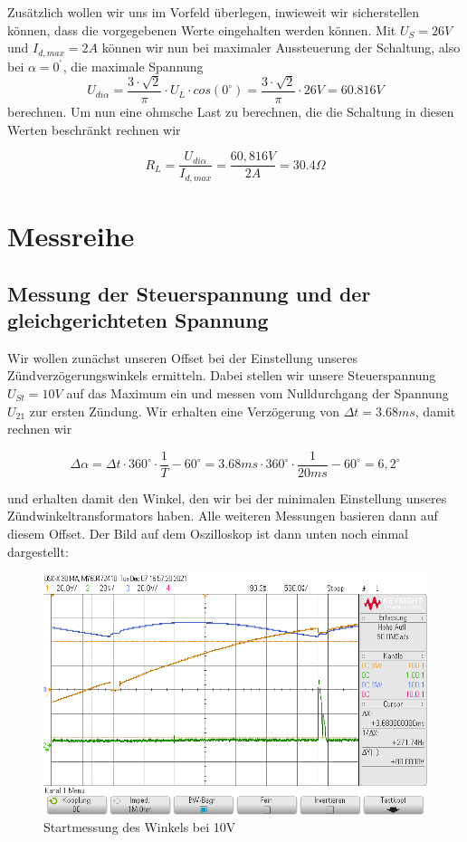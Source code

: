 \documentclass{article}
\begin{document}
Zusätzlich wollen wir uns im Vorfeld überlegen, inwieweit wir sicherstellen können, dass die vorgegebenen Werte eingehalten werden können. Mit $U_{S} = 26V$ und $I_{d,max} = 2A$ können wir nun bei maximaler Aussteuerung der Schaltung, also bei $\alpha = 0^{^{\circ}}$, die maximale Spannung $$U_{di\alpha} = \frac{3\cdot \sqrt{2}}{\pi}\cdot U_{L} \cdot cos(0^{\circ}) = \frac{3\cdot \sqrt{2}}{\pi}\cdot 26V = 60.816V$$
berechnen. Um nun eine ohmsche Last zu berechnen, die die Schaltung in diesen Werten beschränkt rechnen wir

\begin{equation*}
  \label{eq:1}
  R_{L} = \frac{U_{di\alpha}}{I_{d,max}} = \frac{60,816V}{2A} = 30.4 \Omega
\end{equation*}

\section{Messreihe}

\subsection{Messung der Steuerspannung und der gleichgerichteten Spannung}

Wir wollen zunächst unseren Offset bei der Einstellung unseres Zündverzögerungswinkels ermitteln. Dabei stellen wir unsere Steuerspannung $U_{St} = 10V$ auf das Maximum ein und messen vom Nulldurchgang der Spannung $U_{21}$ zur ersten Zündung. Wir erhalten eine Verzögerung von $\Delta t = 3.68ms$, damit rechnen wir

\begin{equation*}
  \label{eq:2}
  \Delta\alpha = \Delta t \cdot 360^{\circ} \cdot \frac{1}{T} - 60^{\circ} = 3.68ms \cdot 360^{\circ} \cdot \frac{1}{20ms} - 60^{\circ} = 6,2^{\circ}
\end{equation*}

und erhalten damit den Winkel, den wir bei der minimalen Einstellung unseres Zündwinkeltransformators haben. Alle weiteren Messungen basieren dann auf diesem Offset. Der Bild auf dem Oszilloskop ist dann unten noch einmal dargestellt:

\begin{figure}[h]
  \centering
  \includegraphics[width=\textwidth]{../assets/images/GEP2/startAngle.png}
  \caption{Startmessung des Winkels bei 10V}
  \label{fig:startAngle}
\end{figure}
\end{document}
